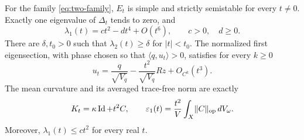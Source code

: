 \begin{theorem}\label{thm:two-factor}
For the family \eqref{eq:two-family}, $E_t$ is simple and strictly
semistable for every $t\ne0$. Exactly one eigenvalue of $\Delta_t$ tends
to zero, and
\begin{equation}\label{eq:two-expansion}
 \lambda_1(t)=ct^2-dt^4+O(t^6),\qquad c>0,\quad d\ge0.
\end{equation}
There are $\delta,t_0>0$ such that $\lambda_2(t)\ge\delta$ for
$|t|<t_0$. The normalized first eigensection, with phase chosen so that
$\langle q,u_t\rangle>0$, satisfies for every $k\ge0$
\begin{equation}\label{eq:two-section}
 u_t=\frac{q}{\sqrt{V_q}}-\frac{t^2}{\sqrt{V_q}}Rz+O_{C^k}(t^3).
\end{equation}
The mean curvature and its averaged trace-free norm are exactly
\begin{equation}\label{eq:two-curvature}
 K_t=\kappa\operatorname{Id}+t^2C,\qquad
 \varepsilon_1(t)=\frac{t^2}{V}\int_X\lVert C\rVert_{\mathrm{op}}\,dV_\omega.
\end{equation}
Moreover, $\lambda_1(t)\le ct^2$ for every real $t$.
\end{theorem}

